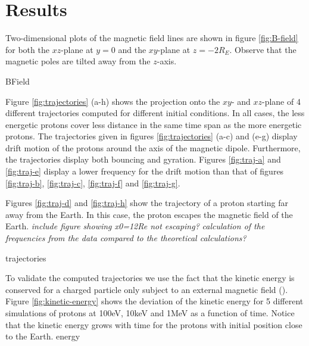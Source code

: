\section{Results}
Two-dimensional plots of the magnetic field lines are shown in figure \ref{fig:B-field} for both the $xz$-plane at $y=0$ and the $xy$-plane at $z = -2R_E$. 
Observe that the magnetic poles are tilted away from the $z$-axis.

{BField}


Figure \ref{fig:trajectories} (a-h) shows the projection onto the $xy$- and $xz$-plane of 4 different trajectories computed for different initial conditions. 
In all cases, the less energetic protons cover less distance in the same time span as the more energetic protons. 
The trajectories given in figures \ref{fig:trajectories} (a-c) and (e-g) display drift motion of the protons around the axis of the magnetic dipole.
Furthermore, the trajectories display both bouncing and gyration.
Figures \ref{fig:traj-a} and \ref{fig:traj-e} display a lower frequency for the drift motion than that of figures \ref{fig:traj-b}, \ref{fig:traj-c}, \ref{fig:traj-f} and \ref{fig:traj-g}.

Figures \ref{fig:traj-d} and \ref{fig:traj-h} show the trajectory of a proton starting far away from the Earth.
In this case, the proton escapes the magnetic field of the Earth.
\textit{include figure showing x0=12Re not escaping?}
\textit{calculation of the frequencies from the data compared to the theoretical calculations?}

{trajectories}

To validate the computed trajectories we use the fact that the kinetic energy is conserved for a charged particle only subject to an external magnetic field (\cite{griffiths_2024}). 
Figure \ref{fig:kinetic-energy} shows the deviation of the kinetic energy for 5 different simulations of protons at 100eV, 10keV and 1MeV as a function of time. 
Notice that the kinetic energy grows with time for the protons with initial position close to the Earth. 
{energy} %
